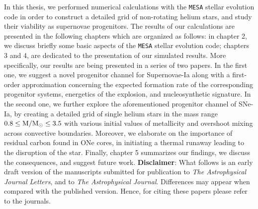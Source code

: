 \documentclass[../../main/thesis_msc.tex]{subfiles}
\begin{document}
			In this thesis, we performed numerical calculations with the \texttt{MESA} stellar evolution code in order to construct a detailed grid of non-rotating helium stars, and study their viability as supernovae progenitors. The results of our calculations are presented in the following chapters which are organized as follows: in chapter 2, we discuss briefly some basic aspects of the \texttt{MESA} stellar evolution code; chapters 3 and 4, are dedicated to the presentation of our simulated results. More specifically, our results are being presented in a series of two papers. In the first one, we suggest a novel progenitor channel for Supernovae-Ia along with a first-order approximation concerning the expected formation rate of the corresponding progenitor systems, energetics of the explosion, and nucleosynthetic signature. In the second one, we further explore the aforementioned progenitor channel of SNe-Ia, by creating a detailed grid of single helium stars in the mass range $\rm 0.8 \leq M/M_{\odot} \leq 3.5$ with various initial values of metallicity and overshoot mixing across convective boundaries. Moreover, we elaborate on the importance of residual carbon found in ONe cores, in initiating a thermal runaway leading to the disruption of the star. Finally, chapter 5 summarizes our findings, we discuss the consequences, and suggest future work.
	\newline
	\noindent \textbf{Disclaimer}: What follows is an early draft version of the manuscripts submitted for publication to \textit{The Astrophysical Journal Letters}, and to \textit{The Astrophysical Journal}. Differences may appear when compared with the published version. Hence, for citing these papers please refer to the journals.
			

				
    
\end{document}
